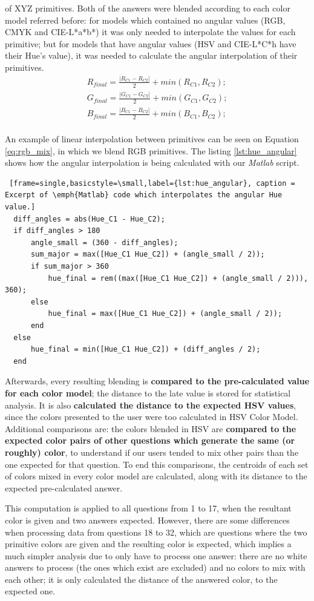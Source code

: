 of XYZ primitives. Both of the answers were blended according to each color model referred before: for models which contained no angular values (\gls{RGB}, \gls{CMYK} and
CIE-L*a*b*) it was only needed to interpolate the values for each primitive; but for models that have angular values (\gls{HSV} and CIE-L*C*h have their Hue's value), it was
needed to calculate the angular interpolation of their primitives.
%
\begin{equation}
  \label{eq:rgb_mix}
  \begin{aligned}
    R_{final} = \frac{|R_{C1} - R_{C2}|}{2} + min(R_{C1}, R_{C2}); \\
    G_{final} = \frac{|G_{C1} - G_{C2}|}{2} + min(G_{C1}, G_{C2}); \\
    B_{final} = \frac{|B_{C1} - B_{C2}|}{2} + min(B_{C1}, B_{C2}); \\
  \end{aligned}
\end{equation} \par
%
An example of linear interpolation between primitives can be seen on Equation \ref{eq:rgb_mix}, in which we blend \gls{RGB} primitives. The listing \ref{lst:hue_angular} shows
how the angular interpolation is being calculated with our \emph{Matlab} script.
%
\begin{lstlisting} [frame=single,basicstyle=\small,label={lst:hue_angular}, caption = Excerpt of \emph{Matlab} code which interpolates the angular Hue value.]
  diff_angles = abs(Hue_C1 - Hue_C2);
  if diff_angles > 180
      angle_small = (360 - diff_angles);
      sum_major = max([Hue_C1 Hue_C2]) + (angle_small / 2));
      if sum_major > 360
          hue_final = rem((max([Hue_C1 Hue_C2]) + (angle_small / 2))), 360);
      else
          hue_final = max([Hue_C1 Hue_C2]) + (angle_small / 2));
      end
  else
      hue_final = min([Hue_C1 Hue_C2]) + (diff_angles / 2);
  end
\end{lstlisting} \par
%
Afterwards, every resulting blending is \textbf{compared to the pre-calculated value for each color model}; the distance to the late value is stored for statistical analysis. It is
also \textbf{calculated the distance to the expected HSV values}, since the colors presented to the user were too calculated in HSV Color Model. Additional comparisons are: the colors
blended in HSV are \textbf{compared to the expected color pairs of other questions which generate the same (or roughly) color}, to understand if our users tended to mix other pairs
than the one expected for that question. To end this comparisons, the centroids of each set of colors mixed in every color model are calculated, along with its distance to the expected
pre-calculated answer. \par
%
This computation is applied to all questions from 1 to 17, when the resultant color is given and two answers expected. However, there are some differences when processing
data from questions 18 to 32, which are questions where the two primitive colors are given and the resulting color is expected, which implies a much simpler analysis due to only have to
process one answer: there are no white answers to process (the ones which exist are excluded) and no colors to mix with each other; it is only calculated the distance of the
answered color, to the expected one.
%
